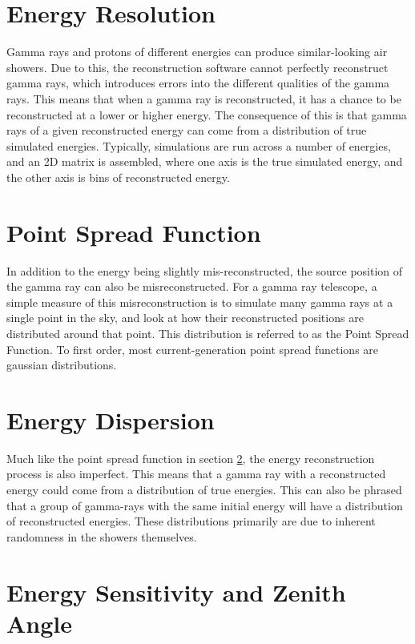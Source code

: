 \section{Energy Resolution}
Gamma rays and protons of different energies can produce similar-looking air showers.
Due to this, the reconstruction software cannot perfectly reconstruct gamma rays, which introduces errors into the different qualities of the gamma rays.
This means that when a gamma ray is reconstructed, it has a chance to be reconstructed at a lower or higher energy.
The consequence of this is that gamma rays of a given reconstructed energy can come from a distribution of true simulated energies.
Typically, simulations are run across a number of energies, and an 2D matrix is assembled, where one axis is the true simulated energy, and the other axis is bins of reconstructed energy.


\section{Point Spread Function}\label{sec:psf}
In addition to the energy being slightly mis-reconstructed, the source position of the gamma ray can also be misreconstructed.
For a gamma ray telescope, a simple measure of this misreconstruction is to simulate many gamma rays at a single point in the sky, and look at how their reconstructed positions are distributed around that point.
This distribution is referred to as the Point Spread Function.
To first order, most current-generation point spread functions are gaussian distributions.


\section{Energy Dispersion}
Much like the point spread function in section \ref{sec:psf}, the energy reconstruction process is also imperfect.
This means that a gamma ray with a reconstructed energy could come from a distribution of true energies.
This can also be phrased that a group of gamma-rays with the same initial energy will have a distribution of reconstructed energies.
These distributions primarily are due to inherent randomness in the showers themselves.


\section{Energy Sensitivity and Zenith Angle}


